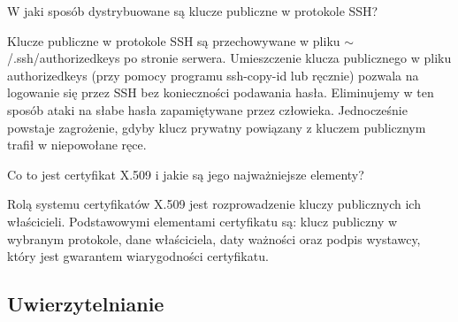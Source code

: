 \documentclass[answers,11pt]{exam}
\begin{document}
\begin{questions}
\question W jaki sposób dystrybuowane są klucze publiczne w protokole SSH?
\begin{solution}
Klucze publiczne w protokole SSH są przechowywane w pliku $\sim$/.ssh/authorized\textunderscore keys po stronie serwera.
Umieszczenie klucza publicznego w pliku authorized\textunderscore keys (przy pomocy programu ssh-copy-id lub ręcznie) pozwala na logowanie się przez SSH bez konieczności podawania hasła. Eliminujemy w ten sposób ataki na słabe hasła zapamiętywane przez człowieka. Jednocześnie powstaje zagrożenie, gdyby klucz prywatny powiązany z kluczem publicznym trafił w niepowołane ręce.
\end{solution}

\question Co to jest certyfikat X.509 i jakie są jego najważniejsze elementy?
\begin{solution}
Rolą systemu certyfikatów X.509 jest rozprowadzenie kluczy publicznych ich właścicieli. Podstawowymi elementami certyfikatu są: klucz publiczny w wybranym protokole, dane właściciela, daty ważności oraz podpis wystawcy, który jest gwarantem wiarygodności certyfikatu.
\end{solution}

\end{questions}


\subsection{Uwierzytelnianie}
\end{document}
